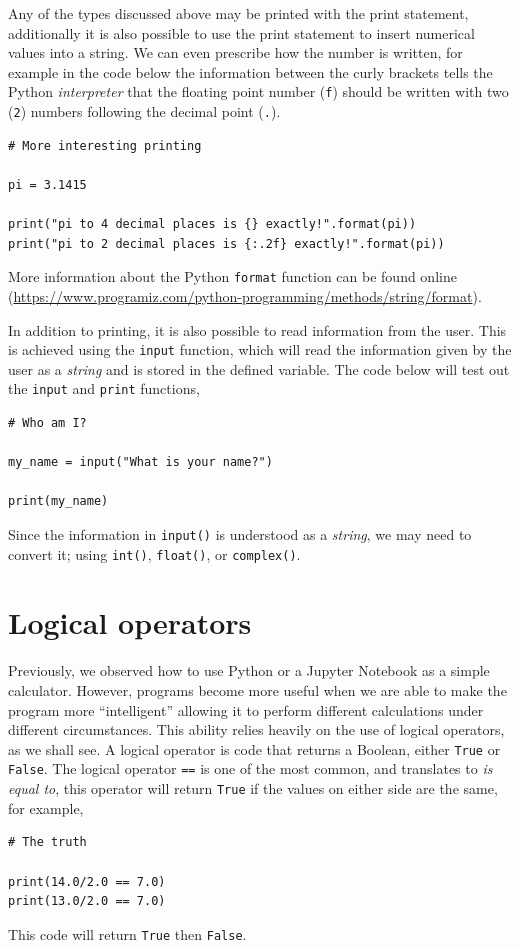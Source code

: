 \documentclass[a4paper]{article}
\begin{document}
Any of the types discussed above may be printed with the print statement, additionally it is also possible to use the print statement to insert numerical values into a string.
We can even prescribe how the number is written, for example in the code below the information between the curly brackets tells the Python \emph{interpreter} that the floating point number (\texttt{f}) should be written with two (\texttt{2}) numbers following the decimal point (\texttt{.}).
\begin{lstlisting}
# More interesting printing

pi = 3.1415

print("pi to 4 decimal places is {} exactly!".format(pi))
print("pi to 2 decimal places is {:.2f} exactly!".format(pi))
\end{lstlisting}
More information about the Python \texttt{format} function can be found online (\url{https://www.programiz.com/python-programming/methods/string/format}).

In addition to printing, it is also possible to read information from the user.
This is achieved using the \texttt{input} function, which will read the information given by the user as a \emph{string} and is stored in the defined variable.
The code below will test out the \texttt{input} and \texttt{print} functions,
\begin{lstlisting}
# Who am I?

my_name = input("What is your name?")

print(my_name)
\end{lstlisting}
Since the information in \texttt{input()} is understood as a \emph{string}, we may need to convert it; using \texttt{int()}, \texttt{float()}, or \texttt{complex()}.

\section{Logical operators}

Previously, we observed how to use Python or a Jupyter Notebook as a simple calculator.
However, programs become more useful when we are able to make the program more ``intelligent'' allowing it to perform different calculations under different circumstances.
This ability relies heavily on the use of logical operators, as we shall see.
A logical operator is code that returns a Boolean, either \texttt{True} or \texttt{False}.
The logical operator \texttt{==} is one of the most common, and translates to \emph{is equal to}, this operator will return \texttt{True} if the values on either side are the same, for example,
\begin{lstlisting}
# The truth

print(14.0/2.0 == 7.0)
print(13.0/2.0 == 7.0)
\end{lstlisting}
This code will return \texttt{True} then \texttt{False}.
\end{document}
